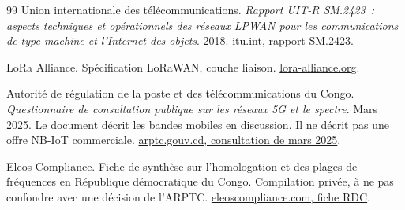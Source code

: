 \documentclass[12pt,a4paper]{article}
\begin{document}
\begin{thebibliography}{99}
Union internationale des télécommunications.
\emph{Rapport UIT-R SM.2423~: aspects techniques et opérationnels des réseaux LPWAN pour les communications de type machine et l'Internet des objets}.
2018.
\href{https://www.itu.int/dms_pub/itu-r/opb/rep/R-REP-SM.2423-2018-PDF-F.pdf}{itu.int, rapport SM.2423}.

LoRa Alliance.
Spécification LoRaWAN, couche liaison.
\href{https://lora-alliance.org/about-lorawan/}{lora-alliance.org}.

Autorité de régulation de la poste et des télécommunications du Congo.
\emph{Questionnaire de consultation publique sur les réseaux 5G et le spectre}.
Mars 2025. Le document décrit les bandes mobiles en discussion. Il ne décrit pas une offre NB-IoT commerciale.
\href{https://arptc.gouv.cd/app/uploads/2025/03/Questionnaire_Consultation-publique_RDC_V7_010325.pdf}{arptc.gouv.cd, consultation de mars 2025}.

Eleos Compliance.
Fiche de synthèse sur l'homologation et des plages de fréquences en République démocratique du Congo.
Compilation privée, à ne pas confondre avec une décision de l'ARPTC.
\href{https://www.eleoscompliance.com/fr/type-approval/congo-republique-d\%C3\%A9mocratique-du-congo}{eleoscompliance.com, fiche RDC}.
\end{thebibliography}
\end{document}
